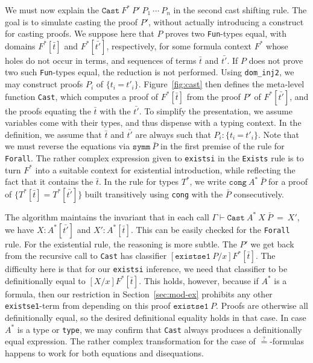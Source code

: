 \documentclass{fundam}
\newcommand{\Eq}[0]{\texttt{=}}
\newcommand{\Qeq}[0]{\stackrel{?}{=}}
\begin{document}
We must now explain the $\texttt{Cast}\ F^*\ P'\ P_1\ \cdots\ P_n$ in
the second cast shifting rule.  The goal is to simulate casting the
proof $P'$, without actually introducing a construct for casting
proofs.  We suppose here that $P$ proves two \texttt{Fun}-types equal,
with domains $F^*[\bar{t}]$ and $F^*[\bar{t'}]$, respectively, for
some formula context $F^*$ whose holes do not occur in terms, and
sequences of terms $\bar{t}$ and $\bar{t'}$.  If $P$ does not prove
two such \texttt{Fun}-types equal, the reduction is not performed.
Using \texttt{dom\_inj2}, we may construct proofs $P_i$ of $\{ t_i\
\Eq\ t'_i\}$.  Figure~\ref{fig:cast} then defines the meta-level
function \texttt{Cast}, which computes a proof of $F^*[\bar{t}]$ from
the proof $P'$ of $F^*[\bar{t'}]$, and the proofs equating the
$\bar{t}$ with the $\bar{t'}$.  To simplify the presentation, we
assume variables come with their types, and thus dispense with a
typing context.  In the definition, we assume that $\bar{t}$ and
$\bar{t'}$ are always such that $P_i : \{ t_i\ \Eq\ t'_i\}$.  Note that we must
reverse the equations via $\texttt{symm}\ \bar{P}$ in the first
premise of the rule for \texttt{Forall}.  The rather complex
expression given to \texttt{existsi} in the \texttt{Exists} rule is to
turn $F^*$ into a suitable context for existential introduction, while
reflecting the fact that it contains the $\bar{t}$.  In the rule for
types $T^*$, we write $\texttt{cong}\ A^*\ \bar{P}$ for a proof of $\{
T^*[\bar{t}] = T^*[\bar{t'}]\}$ built transitively using \texttt{cong}
with the $\bar{P}$ consecutively.

The algorithm maintains the invariant that in each call
$\Gamma\vdash\texttt{Cast}\ A^*\ X\ \bar{P}\ = \ X'$, we have $X :
A^*[\bar{t'}]$ and $X' : A^*[\bar{t}]$.  This can be easily checked
for the \texttt{Forall} rule.  For the existential rule, the reasoning
is more subtle.  The $P'$ we get back from the recursive call to
\texttt{Cast} has classifier $[\texttt{existse1}\ P/x]F^*[\bar{t}]$.
The difficulty here is that for our \texttt{existsi} inference, we
need that classifier to be definitionally equal to
$[X/x]F^*[\bar{t}]$.  This holds, however, because if $A^*$ is a
formula, then our restriction in Section~\ref{sec:mod-ex} prohibits
any other \texttt{existse1}-term from depending on this proof
$\texttt{existse1}\ P$.  Proofs are otherwise all definitionally
equal, so the desired definitional equality holds in that case.  In
case $A^*$ is a type or \texttt{type}, we may confirm that
\texttt{Cast} always produces a definitionally equal expression.  The
rather complex transformation for the case of $\Qeq$-formulas happens
to work for both equations and disequations.
\end{document}
